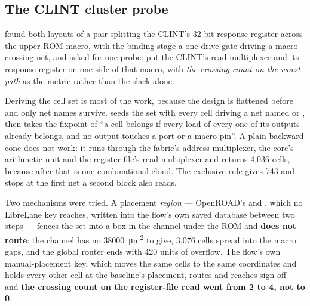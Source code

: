 \subsection{The CLINT cluster probe}
\label{sec:phys-clint}

 found both layouts of a pair splitting the
CLINT's 32-bit response register across the upper ROM macro, with the
binding stage a one-drive gate driving a macro-crossing net, and asked
for one probe: put the CLINT's read multiplexer and its response
register on one side of that macro, with \emph{the crossing count on the
worst path} as the metric rather than the slack alone.

Deriving the cell set is most of the work, because the design is
flattened before  and only net names survive.
 seeds the set with every cell driving a net
named  or , then takes the
fixpoint of ``a cell belongs if every load of every one of its outputs
already belongs, and no output touches a port or a macro pin''. A plain
backward cone does not work: it runs through the fabric's address
multiplexer, the core's arithmetic unit and the register file's read
multiplexer and returns 4,036 cells, because after  that is
one combinational cloud. The exclusive rule gives 743 and stops at the
first net a second block also reads.

Two mechanisms were tried. A placement \emph{region} --- OpenROAD's
 and , which no LibreLane key reaches,
written into the flow's own saved database between two steps --- fences
the set into a box in the channel under the ROM and \textbf{does not
route}: the channel has no \qty{38000}{\micro\metre\squared} to give,
3,076 cells spread into the macro gaps, and the global router ends with
420 units of overflow. The flow's own manual-placement key, which moves
the same cells to the same coordinates and holds every other cell at the
baseline's placement, routes and reaches sign-off --- and \textbf{the
crossing count on the register-file read went from 2 to 4, not to 0}.

